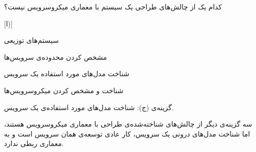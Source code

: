 

کدام یک از چالش‌های طراحی یک سیستم با معماری میکروسرویس نیست؟

[ا)]

 سیستم‌های توزیعی

 مشخص کردن محدوده‌ی سرویس‌ها

 شناخت مدل‌های مورد استفاده یک سرویس

 شناخت و مشخص کردن میکروسرویس‌ها




\begin{پاسخ}

گزینه‌ی (ج): شناخت مدل‌های مورد استفاده‌ی یک سرویس.

سه گزینه‌ی دیگر از چالش‌های شناخته‌شده‌ی طراحی با معماری میکروسرویس هستند،
اما شناخت مدل‌های درونی یک سرویس، کار عادی توسعه‌ی همان سرویس است و به معماری ربطی ندارد.

\end{پاسخ}
